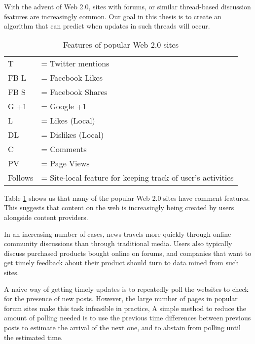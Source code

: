 With the advent of Web 2.0, sites with forums, or similar thread-based
discussion features are increasingly common.  Our goal in this thesis
is to create an algorithm that can predict when updates in such
threads will occur.
\begin{table}\label{table:web20}
	{\footnotesize
\caption{Features of popular Web 2.0 sites}
	\begin{tabular}{l l}
		T &= Twitter mentions\\
	 FB L &= Facebook Likes \\
		FB S &= Facebook Shares\\
	G +1 &= Google +1\\
		   L&= Likes (Local) \\
   		DL &= Dislikes (Local) \\
			C &= Comments \\
		PV &= Page Views \\
   Follows &= Site-local feature for keeping track of user's activities
	\end{tabular}
}
\end{table}

Table \ref{table:web20} shows us that many of the popular Web 2.0
sites have comment features. This suggests that content on the web is
increasingly being created by users alongside content providers.

In an increasing number of cases, news travels more quickly through
online community discussions than through traditional media. Users also
typically discuss purchased products bought online on forums,
and companies that want to get timely feedback about their product
should turn to data mined from such sites.

 A naive way of getting timely updates is to repeatedly poll the websites 
to check for the presence of new posts. However, the large number of 
pages in popular forum sites make this task infeasible in practice, 
A simple method to reduce the amount of polling needed is to use the
previous time differences between previous posts to estimate the
arrival of the next one, and to abstain from polling until the
estimated time.


